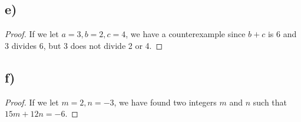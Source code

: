 \documentclass{article}
\begin{document}
\subsection*{e)}
\renewcommand*{\proofname}{Disproof}
\begin{proof}
    If we let $a = 3, b = 2, c = 4$, we have a counterexample since $b + c$ is 6 and 3 divides 6, but 3 does not divide 2 or 4.
\end{proof}

\subsection*{f)}
\renewcommand*{\proofname}{Proof}
\begin{proof}
    If we let $m = 2, n = -3$, we have found two integers $m$ and $n$ such that $15m + 12n = -6$.
\end{proof}
\end{document}
